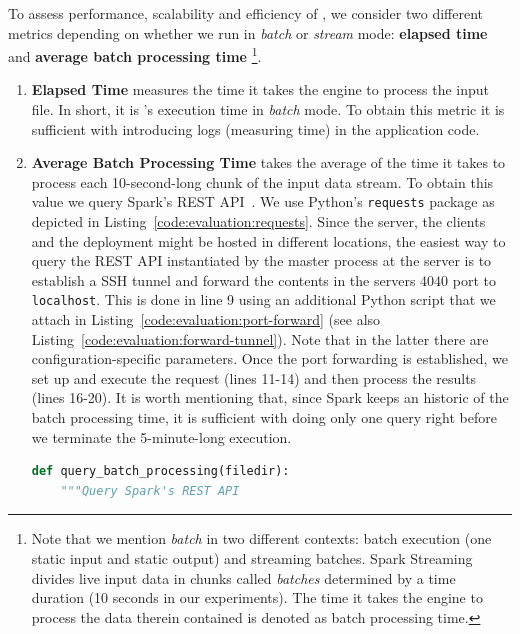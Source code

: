 To assess performance, scalability and efficiency of \projName, we consider two different metrics depending on whether we run in \emph{batch} or \emph{stream} mode: \textbf{elapsed time} and \textbf{average batch processing time}
\footnote{
Note that we mention \textit{batch} in two different contexts: batch execution (one static input and static output) and streaming batches.
Spark Streaming divides live input data in chunks called \emph{batches} determined by a time duration (10 seconds in our experiments).
The time it takes the engine to process the data therein contained is denoted as batch processing time.}.
\begin{enumerate}
    \item \textbf{Elapsed Time} measures the time it takes the engine to process the input file. In short, it is \projName's execution time in \emph{batch} mode. To obtain this metric it is sufficient with introducing logs (measuring time) in the application code.
    \item \textbf{Average Batch Processing Time} takes the average of the time it takes \projName to process each 10-second-long chunk of the input data stream. To obtain this value we query Spark's REST API~\cite{spark-rest-api}. We use Python's \texttt{requests} package as depicted in Listing~\ref{code:evaluation:requests}. Since the server, the clients and the deployment might be hosted in different locations, the easiest way to query the REST API instantiated by the master process at the server is to establish a SSH tunnel and forward the contents in the servers $4040$ port to \texttt{localhost}. This is done in line 9 using an additional Python script that we attach in Listing~\ref{code:evaluation:port-forward} (see also Listing~\ref{code:evaluation:forward-tunnel}). Note that in the latter there are configuration-specific parameters. Once the port forwarding is established, we set up and execute the request (lines 11-14) and then process the results (lines 16-20). It is worth mentioning that, since Spark keeps an historic of the batch processing time, it is sufficient with doing only one query right before we terminate the 5-minute-long execution.
\begin{lstlisting}[language=Python,caption={Snippet illustrating a query to Spark's REST API.},label=code:evaluation:requests]
def query_batch_processing(filedir):
    """Query Spark's REST API 


\end{lstlisting}
\end{enumerate}
